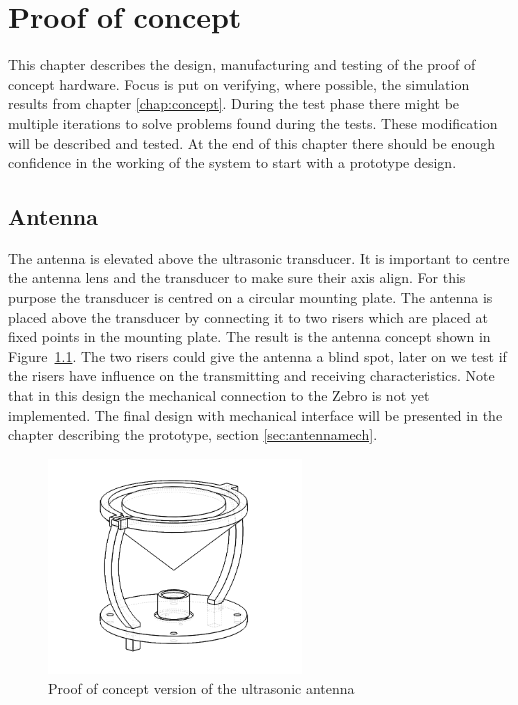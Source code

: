 \chapter{Proof of concept}

This chapter describes the design, manufacturing and testing of the proof of concept hardware.
Focus is put on verifying, where possible, the simulation results from chapter \ref{chap:concept}.
During the test phase there might be multiple iterations to solve problems found during the tests.
These modification will be described and tested.
At the end of this chapter there should be enough confidence in the working of the system to start with a prototype design.

\section{Antenna}
\label{sec:antenna_proof}

The antenna is elevated above the ultrasonic transducer. It is important to centre the antenna lens and the transducer to make sure their axis align. For this purpose the transducer is centred on a circular mounting plate. The antenna is placed above the transducer by connecting it to two risers which are placed at fixed points in the mounting plate. The result is the antenna concept shown in Figure~\ref{fig:proto_ant}. The two risers could give the antenna a blind spot, later on we test if the risers have influence on the transmitting and receiving characteristics.
  Note that in this design the mechanical connection to the Zebro is not yet implemented. The final design with mechanical interface will be presented in the chapter describing the prototype, section \ref{sec:antennamech}.

\begin{figure}[H]
\centering
\includegraphics[width=0.6\textwidth]{Figures/proto_ant.PNG}
\caption{Proof of concept version of the ultrasonic antenna}\label{fig:proto_ant}
\end{figure}

